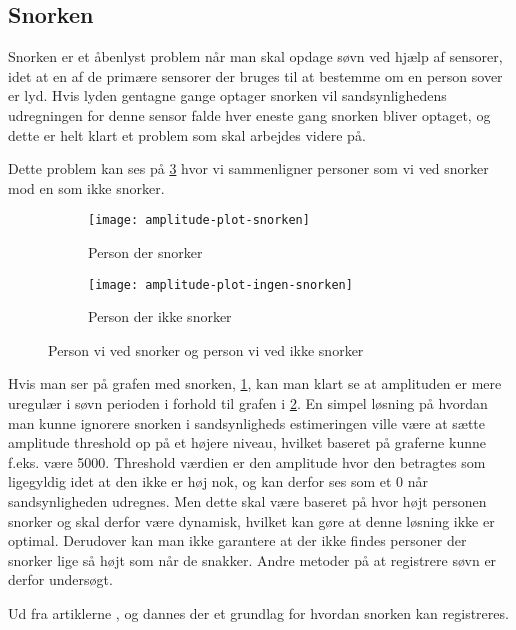 \subsection{Snorken}\label{section:snorken}
Snorken er et åbenlyst problem når man skal opdage søvn ved hjælp af sensorer, idet at en af de primære sensorer der bruges til at bestemme om en person sover er lyd.
Hvis lyden gentagne gange optager snorken vil sandsynlighedens udregningen for denne sensor falde hver eneste gang snorken bliver optaget, og dette er helt klart et problem som skal arbejdes videre på.

Dette problem kan ses på \cref{fig:snorke-vs-ikkesnorken} hvor vi sammenligner personer som vi ved snorker mod en som ikke snorker.

\begin{figure}[h]
\begin{subfigure}{0.49\textwidth}
\texttt{[image: amplitude-plot-snorken]}
\caption{Person der snorker}
\label{fig:person-snorker}
\end{subfigure}
\begin{subfigure}{0.49\textwidth}
\texttt{[image: amplitude-plot-ingen-snorken]}
\caption{Person der ikke snorker}
\label{fig:person-ikke-snorker}
\end{subfigure}
\caption{Person vi ved snorker og person vi ved ikke snorker}
\label{fig:snorke-vs-ikkesnorken}
\end{figure}

Hvis man ser på grafen med snorken, \cref{fig:person-snorker}, kan man klart se at amplituden er mere uregulær i søvn perioden i forhold til grafen i \cref{fig:person-ikke-snorker}. 
En simpel løsning på hvordan man kunne ignorere snorken i sandsynligheds estimeringen ville være at sætte amplitude threshold op på et højere niveau, hvilket baseret på graferne kunne f.eks. være 5000. 
Threshold værdien er den amplitude hvor den betragtes som ligegyldig idet at den ikke er høj nok, og kan derfor ses som et 0 når sandsynligheden udregnes. 
Men dette skal være baseret på hvor højt personen snorker og skal derfor være dynamisk, hvilket kan gøre at denne løsning ikke er optimal. Derudover kan man ikke garantere at der ikke findes personer der snorker lige så højt som når de snakker.
Andre metoder på at registrere søvn er derfor undersøgt.

Ud fra artiklerne \citet{Dafna2013}, \citet{Calabrese20111101} og \citet{7051338} dannes der et grundlag for hvordan snorken kan registreres.

